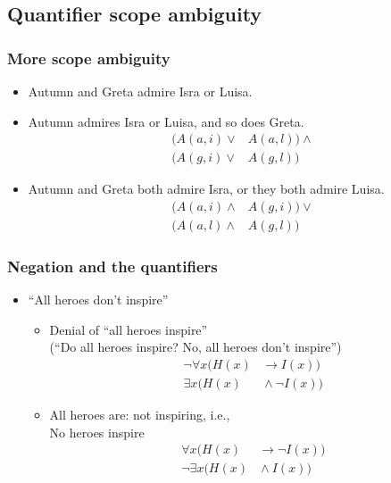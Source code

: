 \subsection{Quantifier scope ambiguity}

\begin{frame}
  \frametitle{More scope ambiguity}

\begin{itemize}[<+->]
\item Autumn and Greta admire Isra or Luisa.
\item Autumn admires Isra or Luisa, and so does Greta.
\begin{align*}
(A(a, i) \lor {} & A(a, l)) \land {}\\
(A(g, i) \lor {} & A(g, l))
\end{align*}
\item Autumn and Greta both admire Isra, or they both admire Luisa.
\begin{align*}
(A(a, i) \land {} & A(g, i)) \lor {}\\
(A(a, l) \land {} & A(g, l))
\end{align*}
\end{itemize}

\end{frame}


\begin{frame}
    \frametitle{Negation and the quantifiers}

\begin{itemize}[<+->]
\item ``All heroes don't inspire''
\begin{itemize}[<+->]
\item Denial of ``all heroes inspire''\\
(``Do all heroes inspire? No, all heroes don't inspire'')\pauses
\begin{align*}
\lnot\forall x(H(x) & {} \to I(x)) \\
\exists x(H(x) & {} \land\lnot I(x))
\end{align*}
\item All heroes are: not inspiring, i.e.,\\
No heroes inspire\pauses
\begin{align*}
\forall x(H(x) & {} \to \lnot I(x)) \\
\lnot\exists x(H(x) & {}\land I(x))
\end{align*}
\end{itemize}
\end{itemize}
\end{frame}

